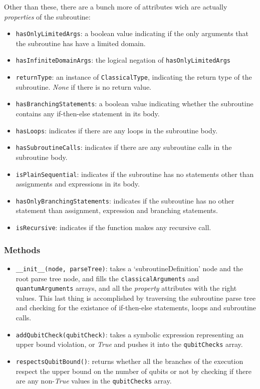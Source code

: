 \documentclass[12pt,a4paper]{report}
\theoremstyle{definition}
\theoremstyle{definition}
\theoremstyle{definition}
\begin{document}
Other than these, there are a bunch more of attributes wich are actually \textit{properties} of the subroutine:
\begin{itemize}
    \itemsep 0em
    \item \texttt{hasOnlyLimitedArgs}: a boolean value indicating if the only arguments that the subroutine has have a limited domain.
    \item \texttt{hasInfiniteDomainArgs}: the logical negation of \texttt{hasOnlyLimitedArgs}
    \item \texttt{returnType}: an instance of \texttt{ClassicalType}, indicating the return type of the subroutine. \textit{None} if there is no return value.
    \item \texttt{hasBranchingStatements}: a boolean value indicating whether the subroutine contains any if-then-else statement in its body.
    \item \texttt{hasLoops}: indicates if there are any loops in the subroutine body.
    \item \texttt{hasSubroutineCalls}: indicates if there are any subroutine calls in the subroutine body.
    \item \texttt{isPlainSequential}: indicates if the subroutine has no statements other than assignments and expressions in its body.
    \item \texttt{hasOnlyBranchingStatements}: indicates if the subroutine has no other statement than assignment, expression and branching statements.
    \item \texttt{isRecursive}: indicates if the function makes any recursive call.
\end{itemize}
\subsubsection{Methods}
\begin{itemize}
    \itemsep 0em
    \item \texttt{\_\_init\_\_(node, parseTree)}: takes a `subroutineDefinition' node and the root parse tree node, and fills the \texttt{classicalArguments} and \texttt{quantumArguments} arrays, and all the \textit{property} attributes with the right values. This last thing is accomplished by traversing the subroutine parse tree and checking for the existance of if-then-else statements, loops and subroutine calls.
    \item \texttt{addQubitCheck(qubitCheck)}: takes a symbolic expression representing an upper bound violation, or \textit{True} and pushes it into the \texttt{qubitChecks} array.
    \item \texttt{respectsQubitBound()}: returns whether all the branches of the execution respect the upper bound on the number of qubits or not by checking if there are any non-\textit{True} values in the \texttt{qubitChecks} array.
\end{itemize}
\end{document}
